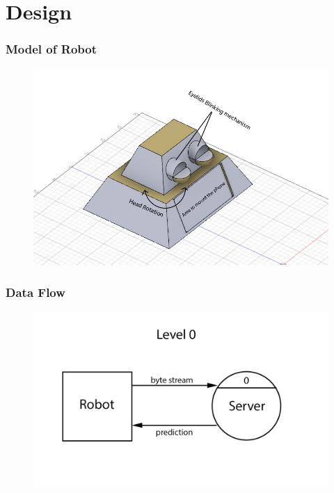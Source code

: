 \documentclass{beamer}
\begin{document}
\section{Design}
\begin{frame}
	\frametitle{Model of Robot}
	\begin{figure}
		\begin{center}
			\includegraphics[scale=.5]{robot_image.jpg}
		\end{center}
	\end{figure}
\end{frame}
\begin{frame}
	\frametitle{Data Flow}
	\begin{figure}
		\begin{center}
			\includegraphics[scale=.7]{level_0_dia.jpg}
		\end{center}
	\end{figure}
\end{frame}
\end{document}
